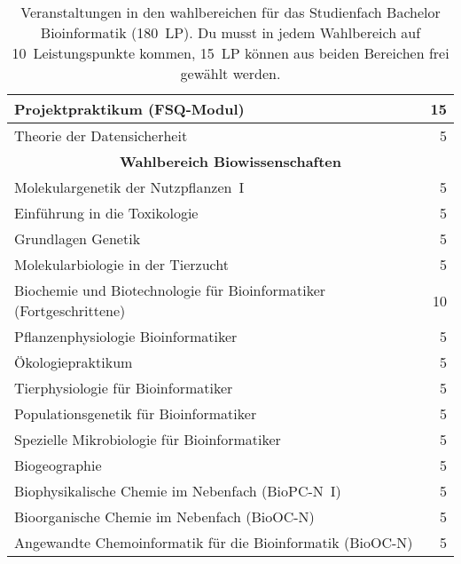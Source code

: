 \begin{table}[!th]
\begin{small}
\begin{tabularx}{\textwidth}{|X||r|}
			Projektpraktikum (FSQ-Modul)                                        &          15 \\ \hline
			Theorie der Datensicherheit                                         &           5 \\ \hline\hline
			\multicolumn{2}{|c|}{\textbf{Wahlbereich Biowissenschaften}}                       \\ \hline
			Molekulargenetik der Nutzpflanzen~I                                 &           5 \\ \hline
			Einführung in die Toxikologie                                       &           5 \\ \hline
			Grundlagen Genetik                                                  &           5 \\ \hline
			Molekularbiologie in der Tierzucht                                  &           5 \\ \hline
			Biochemie und Biotechnologie für Bioinformatiker (Fortgeschrittene) &          10 \\ \hline
			Pflanzenphysiologie Bioinformatiker                                 &           5 \\ \hline
			Ökologiepraktikum                                                   &           5 \\ \hline
			Tierphysiologie für Bioinformatiker                                 &           5 \\ \hline
			Populationsgenetik für Bioinformatiker                              &           5 \\ \hline
			Spezielle Mikrobiologie für Bioinformatiker                         &           5 \\ \hline
			Biogeographie                                                       &           5 \\ \hline
			Biophysikalische Chemie im Nebenfach (BioPC-N~I)                    &           5 \\ \hline
			Bioorganische Chemie im Nebenfach (BioOC-N)                         &           5 \\ \hline
			Angewandte Chemoinformatik für die Bioinformatik (BioOC-N)          &           5 \\ \hline
		\end{tabularx}
	\end{small}
	\caption{Veranstaltungen in den wahlbereichen für das Studienfach Bachelor Bioinformatik (180~LP). Du musst in jedem Wahlbereich auf 10~Leistungspunkte kommen, 15~LP können aus beiden Bereichen frei gewählt werden.\label{plan-bioinfo2}}
\end{table}

